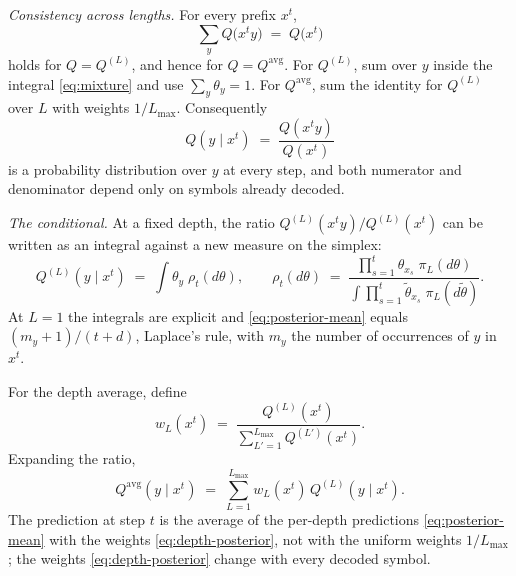 \documentclass[11pt]{article}
\begin{document}
\emph{Consistency across lengths.}  For every prefix $x^t$,
\begin{equation}
\label{eq:consistency}
  \sum_{y} Q\bigl(x^{t}y\bigr) \;=\; Q\bigl(x^{t}\bigr)
\end{equation}
holds for $Q = Q^{(L)}$, and hence for $Q = Q^{\mathrm{avg}}$.  For
$Q^{(L)}$, sum over $y$ inside the integral \eqref{eq:mixture} and
use $\sum_y \theta_y = 1$.  For $Q^{\mathrm{avg}}$, sum the identity
for $Q^{(L)}$ over $L$ with weights $1/L_{\max}$.  Consequently
\begin{equation*}
  Q(y \mid x^{t}) \;=\; \frac{Q(x^{t}y)}{Q(x^{t})}
\end{equation*}
is a probability distribution over $y$ at every step, and both
numerator and denominator depend only on symbols already decoded.

\emph{The conditional.}  At a fixed depth, the ratio
$Q^{(L)}(x^t y)/Q^{(L)}(x^t)$ can be written as an integral against a
new measure on the simplex:
\begin{equation}
\label{eq:posterior-mean}
  Q^{(L)}(y \mid x^{t})
  \;=\; \int \theta_y \; \rho_t(d\theta),
  \qquad
  \rho_t(d\theta)
  \;=\;
  \frac{\prod_{s=1}^{t} \theta_{x_s}\; \pi_L(d\theta)}
       {\displaystyle\int
        \prod_{s=1}^{t} \tilde\theta_{x_s}\; \pi_L(d\tilde\theta)}.
\end{equation}
At $L = 1$ the integrals
are explicit and \eqref{eq:posterior-mean} equals
$(m_y + 1)/(t + d)$, Laplace's rule, with $m_y$ the number of
occurrences of $y$ in $x^t$.

For the depth average, define
\begin{equation}
\label{eq:depth-posterior}
  w_L(x^t) \;=\;
  \frac{Q^{(L)}(x^t)}{\sum_{L'=1}^{L_{\max}} Q^{(L')}(x^t)}.
\end{equation}
Expanding the ratio,
\begin{equation*}
  Q^{\mathrm{avg}}(y \mid x^{t})
  \;=\; \sum_{L=1}^{L_{\max}} w_L(x^{t})\, Q^{(L)}(y \mid x^{t}).
\end{equation*}
The prediction at step $t$ is the average of the per-depth
predictions \eqref{eq:posterior-mean} with the weights
\eqref{eq:depth-posterior}, not with the uniform weights
$1/L_{\max}$; the weights \eqref{eq:depth-posterior} change with
every decoded symbol.
\end{document}
